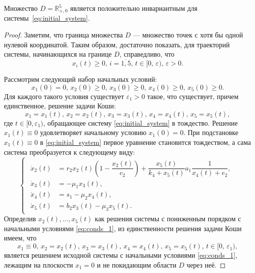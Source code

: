\documentclass[14pt,a4paper]{extarticle}
\begin{document}
	\begin{theorem}
		Множество $D=\mathbb{R}^5_{+,0}$ является положительно инвариантным для системы~\ref{eq:initial_system}.
	\end{theorem}
	\begin{proof}
		Заметим, что граница множества $D$ --- множество точек с хотя бы одной нулевой координатой. Таким образом, достаточно показать, для траекторий системы, начинающихся на границе $D$, справедливо, что 
		\[x_i(t)\ge0,\, i=\overline{1,5},\, t\in[0,\,\varepsilon),\,\varepsilon>0.\]
		
		Рассмотрим следующий набор начальных условий:
		\begin{equation}\label{eq:conds_1}
			x_1(0)=0,\, x_2(0)\ge0,\, x_3(0)\ge0,\, x_4(0)\ge0,\, x_5(0)\ge0.
		\end{equation}
		Для каждого такого условия существует $\varepsilon_1>0$ такое, что существует, причем единственное, решение задачи Коши: 
		\begin{equation*}
			x_1=x_1(t),\, x_2=x_2(t),\, x_3=x_3(t),\, x_4=x_4(t),\, x_5=x_5(t),
		\end{equation*}
		где $t\in[0,\varepsilon_1)$, обращающее систему \ref{eq:initial_system} в тождество. Решение $x_1(t)\equiv0$ удовлетворяет начальному условию $x_1(0)=0$. При подстановке $x_1(t)\equiv0$ в \ref{eq:initial_system} первое уравнение становится тождеством, а сама система преобразуется к следующему виду:
		\begin{equation*}
			\begin{cases}
				\begin{aligned}
					\dot{x}_2(t) &= r_2x_2(t)\left(1-\dfrac{x_2(t)}{c_2}\right)+\dfrac{x_5(t)}{k_4+x_5(t)}a_1\dfrac{1}{x_4(t)+e_2},\\
					\dot{x}_3(t) &= -\mu_1x_3(t),\\
					\dot{x}_4(t) &= s_1 - \mu_2x_4(t),\\
					\dot{x}_5(t) &= b_2x_3(t)-\mu_3x_5(t).
				\end{aligned}
			\end{cases}
		\end{equation*} 
		Определив $x_2(t),\ldots,x_5(t)$ как решения системы с пониженным порядком с начальными условиями \ref{eq:conds_1}, из единственности решения задачи Коши имеем, что
		\begin{equation*}
		x_1\equiv0,\, x_2=x_2(t),\, x_3=x_3(t),\, x_4=x_4(t),\, x_5=x_5(t),\, t\in[0,\,\varepsilon_1),
		\end{equation*}
		является решением исходной системы с начальными условиями \ref{eq:conds_1}, лежащим на плоскости $x_1=0$ и не покидающим области $D$ через неё.
		

\end{proof}
\end{document}
